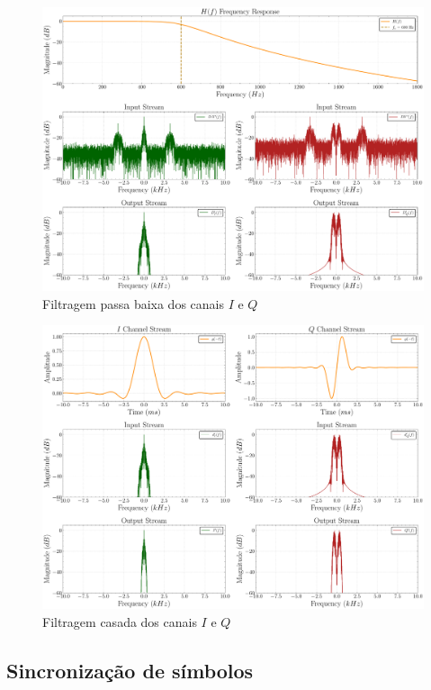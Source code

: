 \begin{figure}[H]
	\centering
	\caption{Filtragem passa baixa dos canais $I$ e $Q$}\label{fig:receiver_lpf}
	\includegraphics[width=\linewidth]{assets/cap3/receiver_lpf_freq.pdf}
\end{figure}

\begin{figure}[H]
	\centering
	\caption{Filtragem casada dos canais $I$ e $Q$}\label{fig:receiver_matchedfilter}
	\includegraphics[width=\linewidth]{assets/cap3/receiver_mf_freq.pdf}
\end{figure}

\subsection{Sincronização de símbolos}\label{sec:sincronizacao}

